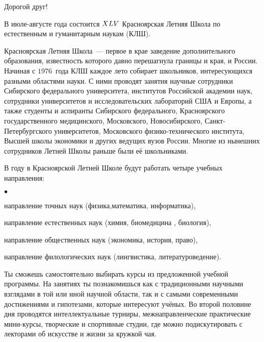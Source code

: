 \IntroSize


Дорогой друг!\\

\vspace{\baselineskip}

В июле-августе \theyear{} года состоится $XLV{}$ Красноярская Летняя Школа по естественным и гуманитарным наукам (КЛШ). 

Красноярская Летняя Школа~— первое в крае заведение дополнительного образования, известность которого давно перешагнула границы и края, и России. Начиная с $1976$~года КЛШ каждое лето собирает школьников, интересующихся разными областями науки. С ними проводят занятия научные сотрудники Сибирского федерального университета, институтов Российской академии наук, сотрудники университетов и исследовательских лабораторий США и Европы, а также студенты и аспиранты Сибирского федерального, Красноярского государственного медицинского, Московского, Новосибирского, Санкт-Петербургского университетов, Московского физико-технического института, Высшей школы экономики и других ведущих вузов России. Многие из нынешних сотрудников Летней Школы раньше были её школьниками.

В \theyear{} году в Красноярской Летней Школе будут работать четыре учебных направления:
\begin{list}{$\bullet$}{\leftmargin=6mm  \topsep=0mm  \itemsep=0pt \parsep=0mm \itemindent=-1pt}
\item направление точных наук (физика,математика, информатика),
\item направление естественных наук (химия, биомедицина , биология),
\item направление общественных наук (экономика, история, право),
\item направление филологических наук (лингвистика, литературоведение).
\end{list}
Ты сможешь самостоятельно выбирать курсы из предложенной учебной программы.
\iffalse У тебя будет возможность  самостоятельно выбрать из предложенной учебной программы курсы, которые будешь посещать. \fi На занятиях ты познакомишься как с традиционными научными взглядами в той или иной научной области, так и с самыми современными достижениями и гипотезами, которые интересуют учёных. Во второй половине дня проводятся интеллектуальные турниры, межнаправленческие практические мини-курсы,   творческие и спортивные студии, где можно подискутировать с лекторами об искусстве и жизни за кружкой чая.

